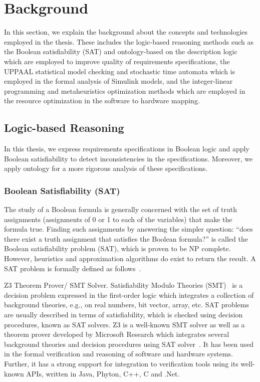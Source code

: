 \chapter{Background}
In this section, we explain the background about the concepts and technologies employed in the thesis. These includes the logic-based reasoning methods such as the Boolean satisfiability (SAT) and ontology-based on the description logic which are employed to improve quality of requirements specifications, the UPPAAL statistical model checking and stochastic time automata which is employed in the formal analysis of Simulink models, and the integer-linear programming and metaheuristics optimization methods which are employed in the resource optimization  in the software to hardware mapping.
\section{Logic-based Reasoning}
In this thesis, we express requirements specifications in  Boolean logic and apply Boolean satisfiability to detect inconsistencies in the specifications. Moreover, we apply ontology for a more rigorous analysis of these specifications.
\subsection*{Boolean Satisfiability (SAT)}
The study of a Boolean formula is generally concerned with the set of truth assignments (assignments of 0 or 1 to each of the variables) that make the formula true. Finding such assignments by answering the simpler question: ``does there exist a truth assignment that satisfies the Boolean formula?'' is called the Boolean satisfiability problem (SAT), which is proven to be NP complete. However, heuristics and approximation algorithms do exist to return the result. A SAT problem is formally defined as follows~\cite{devlin2008satisfiability}.

Z3 Theorem Prover/ SMT Solver. Satisfiability Modulo Theories (SMT)~\cite{Biere2009HandbookSatisfiability} is a decision problem expressed in the first-order logic which integrates a collection of background theories, e.g., on real numbers, bit vector, array, etc. SAT problems are usually described in terms of satisfiability, which is checked using decision procedures, known as SAT solvers. Z3 is a well-known SMT solver as well as a theorem prover developed by Microsoft Research which integrates several background theories and decision procedures using SAT solver~\cite{DeMoura2008Z3:Solver}. It has been used in the formal verification and reasoning of software and hardware systems. Further, it has a strong support for integration to verification tools using its well-known APIs, written in Java, Phyton, C++, C and .Net.

